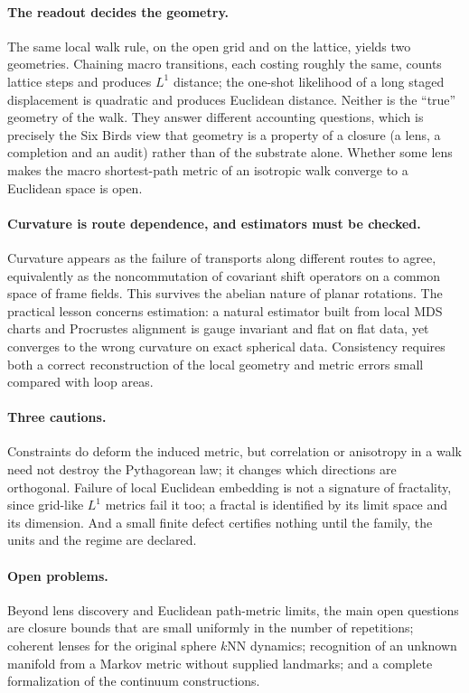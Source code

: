 \documentclass[11pt]{article}
\begin{document}
\paragraph{The readout decides the geometry.}
The same local walk rule, on the open grid and on the lattice, yields two geometries.
Chaining macro transitions, each costing roughly the same, counts lattice steps and produces $L^1$ distance; the one-shot likelihood of a long staged displacement is quadratic and produces Euclidean distance.
Neither is the ``true'' geometry of the walk.
They answer different accounting questions, which is precisely the Six Birds view that geometry is a property of a closure (a lens, a completion and an audit) rather than of the substrate alone.
Whether some lens makes the macro shortest-path metric of an isotropic walk converge to a Euclidean space is open.

\paragraph{Curvature is route dependence, and estimators must be checked.}
Curvature appears as the failure of transports along different routes to agree, equivalently as the noncommutation of covariant shift operators on a common space of frame fields.
This survives the abelian nature of planar rotations.
The practical lesson concerns estimation: a natural estimator built from local MDS charts and Procrustes alignment is gauge invariant and flat on flat data, yet converges to the wrong curvature on exact spherical data.
Consistency requires both a correct reconstruction of the local geometry and metric errors small compared with loop areas.

\paragraph{Three cautions.}
Constraints do deform the induced metric, but correlation or anisotropy in a walk need not destroy the Pythagorean law; it changes which directions are orthogonal.
Failure of local Euclidean embedding is not a signature of fractality, since grid-like $L^1$ metrics fail it too; a fractal is identified by its limit space and its dimension.
And a small finite defect certifies nothing until the family, the units and the regime are declared.

\paragraph{Open problems.}
Beyond lens discovery and Euclidean path-metric limits, the main open questions are closure bounds that are small uniformly in the number of repetitions; coherent lenses for the original sphere $k$NN dynamics; recognition of an unknown manifold from a Markov metric without supplied landmarks; and a complete formalization of the continuum constructions.
\end{document}
